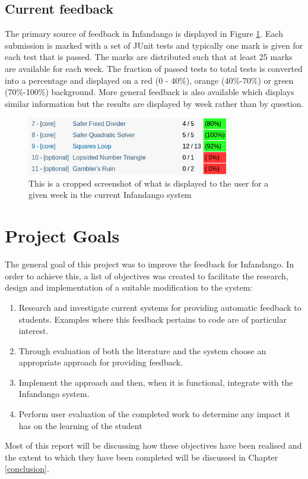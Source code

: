 \subsection{Current feedback}
The primary source of feedback in Infandango is displayed in Figure \ref{fig:currentfeedback}. Each submission is marked with a set of JUnit tests and typically one mark is given for each test that is passed. The marks are distributed such that at least 25 marks are available for each week. The fraction of passed tests to total tests is converted into a percentage and displayed on a red (0 - 40\%), orange (40\%-70\%) or green (70\%-100\%) background.
More general feedback is also available which displays similar information but the results are displayed by week rather than by question. 

\begin{figure}[h!]
\centering
\includegraphics[width=0.8\textwidth]{images/currentfeedback.png}
\caption{This is a cropped screenshot of what is displayed to the user for a given week in the current Infandango system}
\label{fig:currentfeedback}
\end{figure}

\section{Project Goals}
The general goal of this project was to improve the feedback for  Infandango. In order to achieve this, a list of objectives was created to facilitate the research, design and implementation of a suitable modification to the system:

\begin{enumerate}
\item Research and investigate current systems for providing automatic feedback to students. Examples where this feedback pertains to code are of particular interest.
\item Through evaluation of both the literature and the system choose an appropriate approach for providing feedback.
\item Implement the approach and then, when it is functional, integrate with the Infandango system.
\item Perform user evaluation of the completed work to determine any impact it has on the learning of the student
\end{enumerate}

Most of this report will be discussing how these objectives have been realised and the extent to which they have been completed will be discussed in Chapter \ref{conclusion}.
